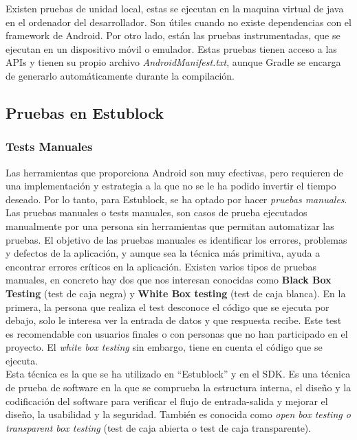 Existen pruebas de unidad local, estas se ejecutan en la maquina virtual de java en el ordenador del desarrollador. Son útiles cuando no existe dependencias con el framework de Android. Por otro lado, están las pruebas instrumentadas, que se ejecutan en un dispositivo móvil o emulador. Estas pruebas tienen acceso a las APIs y tienen su propio archivo \emph{AndroidManifest.txt}, aunque Gradle se encarga de generarlo automáticamente durante la compilación. 

\subsection{Pruebas en Estublock}

\subsubsection{Tests Manuales}

Las herramientas que proporciona Android son muy efectivas, pero requieren de una implementación y estrategia a la que no se le ha podido invertir el tiempo deseado. Por lo tanto, para Estublock, se ha optado por hacer \emph{pruebas manuales}. Las pruebas manuales o tests manuales, son casos de prueba ejecutados manualmente por una persona sin herramientas que permitan automatizar las pruebas. El objetivo de las pruebas manuales es identificar los errores, problemas y defectos de la aplicación, y aunque sea la técnica más primitiva, ayuda a encontrar errores críticos en la aplicación. Existen varios tipos de pruebas manuales, en concreto hay dos que nos interesan conocidas como \textbf{Black Box Testing} (test de caja negra) y \textbf{White Box testing} (test de caja blanca). En la primera, la persona que realiza el test desconoce el código que se ejecuta por debajo, solo le interesa ver la entrada de datos y que respuesta recibe. Este test es recomendable con usuarios finales o con personas que no han participado en el proyecto. El \emph{white box testing} sin embargo, tiene en cuenta el código que se ejecuta. \\

Esta técnica es la que se ha utilizado en ``Estublock'' y en el SDK. Es una técnica de prueba de software en la que se comprueba la estructura interna, el diseño y la codificación del software para verificar el flujo de entrada-salida y mejorar el diseño, la usabilidad y la seguridad. También es conocida como \emph{open box testing o transparent box testing} (test de caja abierta o test de caja transparente).

